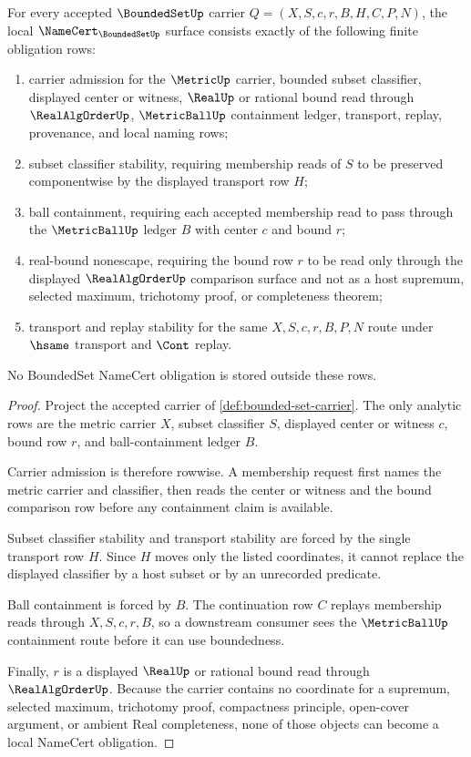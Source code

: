 \begin{theorem}
\label{thm:bounded-set-namecert-obligations}
For every accepted $\BoundedSetUp$ carrier $Q=(X,S,c,r,B,H,C,P,N)$, the local $\NameCert_{\BoundedSetUp}$ surface consists exactly of the following finite obligation rows:
\begin{enumerate}
\item carrier admission for the $\MetricUp$ carrier, bounded subset classifier, displayed center or witness, $\RealUp$ or rational bound read through $\RealAlgOrderUp$, $\MetricBallUp$ containment ledger, transport, replay, provenance, and local naming rows;
\item subset classifier stability, requiring membership reads of $S$ to be preserved componentwise by the displayed transport row $H$;
\item ball containment, requiring each accepted membership read to pass through the $\MetricBallUp$ ledger $B$ with center $c$ and bound $r$;
\item real-bound nonescape, requiring the bound row $r$ to be read only through the displayed $\RealAlgOrderUp$ comparison surface and not as a host supremum, selected maximum, trichotomy proof, or completeness theorem;
\item transport and replay stability for the same $X,S,c,r,B,P,N$ route under $\hsame$ transport and $\Cont$ replay.
\end{enumerate}
No BoundedSet NameCert obligation is stored outside these rows.
\end{theorem}
\begin{proof}
Project the accepted carrier of \autoref{def:bounded-set-carrier}. The only analytic rows are the metric carrier $X$, subset classifier $S$, displayed center or witness $c$, bound row $r$, and ball-containment ledger $B$.

Carrier admission is therefore rowwise. A membership request first names the metric carrier and classifier, then reads the center or witness and the bound comparison row before any containment claim is available.

Subset classifier stability and transport stability are forced by the single transport row $H$. Since $H$ moves only the listed coordinates, it cannot replace the displayed classifier by a host subset or by an unrecorded predicate.

Ball containment is forced by $B$. The continuation row $C$ replays membership reads through $X,S,c,r,B$, so a downstream consumer sees the $\MetricBallUp$ containment route before it can use boundedness.

Finally, $r$ is a displayed $\RealUp$ or rational bound read through $\RealAlgOrderUp$. Because the carrier contains no coordinate for a supremum, selected maximum, trichotomy proof, compactness principle, open-cover argument, or ambient Real completeness, none of those objects can become a local NameCert obligation.
\end{proof}

